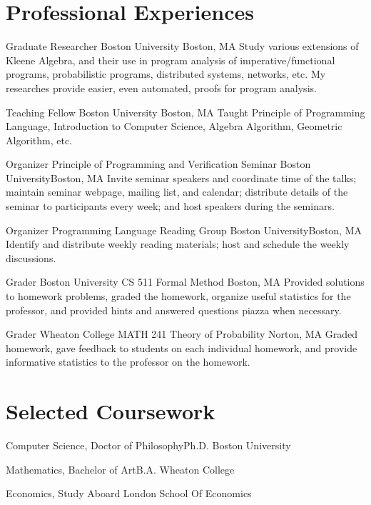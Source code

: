 \documentclass[11pt,roman]{moderncv}        %
\begin{document}
\section{Professional Experiences}

{Graduate Researcher}
{Boston University}
{Boston, MA}{}
{Study various extensions of Kleene Algebra, and their use in program analysis
of imperative/functional programs, probabilistic programs, distributed systems, networks, etc.
My researches provide easier, even automated, proofs for program analysis.
}

{Teaching Fellow}
{Boston University}
{Boston, MA}{}
{
  Taught Principle of Programming Language, Introduction to Computer Science,
  Algebra Algorithm, Geometric Algorithm, etc.
}


{Organizer}
{Principle of Programming and Verification Seminar}
{Boston University}{Boston, MA}
{Invite seminar speakers and coordinate time of the talks;
maintain seminar webpage, mailing list, and calendar;
distribute details of the seminar to participants every week;
and host speakers during the seminars.}

{Organizer}
{Programming Language Reading Group}
{Boston University}{Boston, MA}
{Identify and distribute weekly reading materials;
host and schedule the weekly discussions.}

{Grader}
{Boston University CS 511 Formal Method}
{Boston, MA}{}
{Provided solutions to homework problems, graded the homework,
organize useful statistics for the professor, 
and provided hints and answered questions piazza when necessary.}

{Grader}
{Wheaton College MATH 241 Theory of Probability}
{Norton, MA}{}
{Graded homework, gave feedback to students on each individual homework,
and provide informative statistics to the professor on the homework.}


\section{Selected Coursework}

{Computer Science, \iftechnical Doctor of Philosophy\else Ph.D.\fi} {}
{Boston University} {} {}  %


{Mathematics, \iftechnical Bachelor of Art\else B.A.\fi} {}
{Wheaton College} {} {}

{Economics, Study Aboard} {}
{London School Of Economics} {} {}  %
\end{document}
